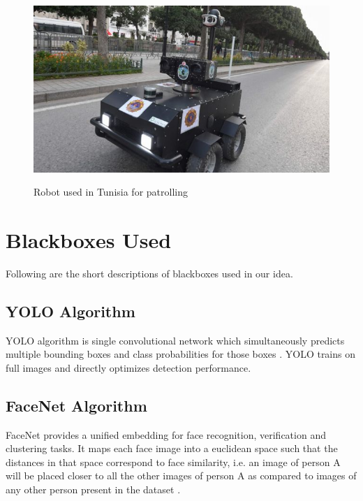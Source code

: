 \documentclass[10pt,twocolumn,letterpaper]{article}
\begin{document}
\begin{figure}[!htb]
	\centering\includegraphics[width=\columnwidth]{tunisia.jpg}\\
	\caption{Robot used in Tunisia for patrolling}\label{robo}
\end{figure}


\section{Blackboxes Used}
Following are the short descriptions of blackboxes used in our idea.
\subsection{YOLO Algorithm}
 YOLO algorithm is single convolutional network which simultaneously predicts multiple bounding boxes and class probabilities for those boxes \cite{yolo}. YOLO trains on full images and directly optimizes detection performance. 
 
 \subsection{FaceNet Algorithm}
 FaceNet provides a unified embedding for face recognition, verification and clustering tasks. It maps each face image into a euclidean space such that the distances in that space correspond to face similarity, i.e. an image of person A will be placed closer to all the other images of person A as compared to images of any other person present in the dataset  \cite{Schroff_2015}.
 
\end{document}
